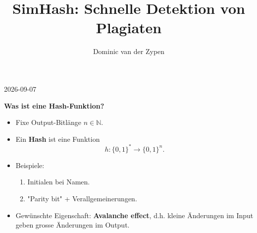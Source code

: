 \documentclass[aspectratio=169, 10pt]{beamer}
\title{\textbf{SimHash: Schnelle Detektion von Plagiaten}}
\author{Dominic van der Zypen}
\date{}
\begin{document}
\begin{frame}
  \titlepage
  \vspace*{-3cm}
  \begin{center}{2026-09-07}\end{center}
\end{frame}

\begin{frame}[fragile]
  \vspace{-0.2cm}
  {\large \textcolor{nerdCyan}{\textbf{Was ist eine Hash-Funktion?}}}
  
  \vspace{0.15cm}

  \begin{itemize}
    \item Fixe Output-Bitl\"ange \textcolor{nerdGreen}{$n\in\mathbb{N}$}. 
    \item Ein \textcolor{nerdGreen}{{\bf Hash}} ist eine 
      Funktion $$h:\{0,1\}^*\to \{0,1\}^n.$$
    \item Beispiele: 
      \begin{enumerate}
        \item Initialen bei Namen.
        \item "Parity bit" + Verallgemeinerungen.
      \end{enumerate}
    \item Gew\"unschte Eigenschaft: \textcolor{nerdRed}{{\bf Avalanche effect}},
      d.h. kleine \"Anderungen im Input geben grosse \"Anderungen
      im Output.
  \end{itemize}
  
\end{frame}
\end{document}
